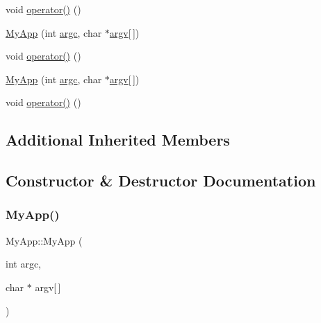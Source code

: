 \begin{DoxyCompactItemize}
\item 
void \hyperlink{class_my_app_a376d7e3ddb7ab21223f29a7263b6fb14}{operator()} ()
\item 
\hyperlink{class_my_app_a2cedcf8942b99702d5e26db7d07ff57b}{My\+App} (int \hyperlink{class_sample_generation_app_af98f6187cc8eb62fc3fe0ff53df76b6e}{argc}, char $\ast$\hyperlink{class_sample_generation_app_a7e490e3711491c2bc58351f9e9dd9945}{argv}\mbox{[}$\,$\mbox{]})
\item 
void \hyperlink{class_my_app_a376d7e3ddb7ab21223f29a7263b6fb14}{operator()} ()
\item 
\hyperlink{class_my_app_a2cedcf8942b99702d5e26db7d07ff57b}{My\+App} (int \hyperlink{class_sample_generation_app_af98f6187cc8eb62fc3fe0ff53df76b6e}{argc}, char $\ast$\hyperlink{class_sample_generation_app_a7e490e3711491c2bc58351f9e9dd9945}{argv}\mbox{[}$\,$\mbox{]})
\item 
void \hyperlink{class_my_app_a376d7e3ddb7ab21223f29a7263b6fb14}{operator()} ()
\end{DoxyCompactItemize}
\subsection*{Additional Inherited Members}


\subsection{Constructor \& Destructor Documentation}
\mbox{\label{class_my_app_a2cedcf8942b99702d5e26db7d07ff57b}} 
\subsubsection{\texorpdfstring{My\+App()}{MyApp()}\hspace{0.1cm}{\footnotesize\ttfamily [1/8]}}
{\footnotesize\ttfamily My\+App\+::\+My\+App (\begin{DoxyParamCaption}\item[{int}]{argc,  }\item[{char $\ast$}]{argv\mbox{[}$\,$\mbox{]} }\end{DoxyParamCaption})\hspace{0.3cm}{\ttfamily [inline]}}

\mbox{\label{class_my_app_a2cedcf8942b99702d5e26db7d07ff57b}} 
